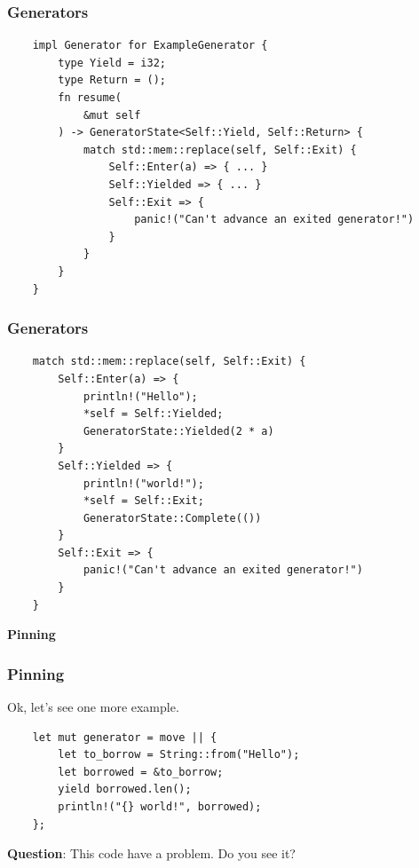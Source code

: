 \documentclass[aspectratio=1610,t]{beamer}
\begin{document}

\begin{frame}[fragile]
\frametitle{Generators}
\begin{verbatim}
    impl Generator for ExampleGenerator {
        type Yield = i32;
        type Return = ();
        fn resume(
            &mut self
        ) -> GeneratorState<Self::Yield, Self::Return> {
            match std::mem::replace(self, Self::Exit) {
                Self::Enter(a) => { ... }
                Self::Yielded => { ... }
                Self::Exit => {
                    panic!("Can't advance an exited generator!")
                }
            }
        }
    }
\end{verbatim}
\end{frame}


\begin{frame}[fragile]
\frametitle{Generators}
\begin{verbatim}
    match std::mem::replace(self, Self::Exit) {
        Self::Enter(a) => {
            println!("Hello");
            *self = Self::Yielded;
            GeneratorState::Yielded(2 * a)
        }
        Self::Yielded => {
            println!("world!");
            *self = Self::Exit;
            GeneratorState::Complete(())
        }
        Self::Exit => {
            panic!("Can't advance an exited generator!")
        }
    }
\end{verbatim}
\end{frame}


\begin{frame}[c]
\centering\Huge\textbf{Pinning}
\end{frame}


\begin{frame}[fragile]
\frametitle{Pinning}
Ok, let's see one more example.

\begin{verbatim}
    let mut generator = move || {
        let to_borrow = String::from("Hello");
        let borrowed = &to_borrow;
        yield borrowed.len();
        println!("{} world!", borrowed);
    };
\end{verbatim}

\textbf{Question}: This code have a problem. Do you see it?

\end{frame}
\end{document}
